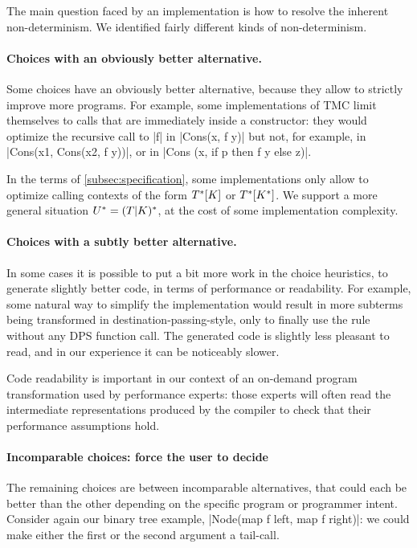 The main question faced by an implementation is how to resolve the
inherent non-determinism. We identified fairly different kinds of
non-determinism.

\paragraph{Choices with an obviously better alternative.} Some choices have an obviously better alternative, because they allow to strictly improve more programs. For example, some implementations of TMC limit themselves to calls that are immediately inside a constructor: they would optimize the recursive call to \ocaml|f| in \ocaml|Cons(x, f y)| but not, for example, in \ocaml|Cons(x1, Cons(x2, f y))|, or in \ocaml|Cons (x, if p then f y else z)|.

In the terms of \cref{subsec:specification}, some implementations only allow to optimize calling contexts of the form $\datalangTailCtx{[\datalangConsFrame]}$ or $\datalangTailCtx{[\datalangConsCtx]}$. We support a more general situation $\datalangTMCCtx = (\datalangTailFrame | \datalangConsFrame)^{*}$, at the cost of some implementation complexity.

\paragraph{Choices with a subtly better alternative.} In some cases it
is possible to put a bit more work in the choice heuristics, to
generate slightly better code, in terms of performance or
readability. For example, some natural way to simplify the
implementation would result in more subterms being transformed in
destination-passing-style, only to finally use the
 rule without any DPS function call. The generated
code is slightly less pleasant to read, and in our experience it can
be noticeably slower.

Code readability is important in our context of an on-demand program
transformation used by performance experts: those experts will often
read the intermediate representations produced by the compiler to
check that their performance assumptions hold.

\paragraph{Incomparable choices: force the user to decide} The
remaining choices are between incomparable alternatives, that could
each be better than the other depending on the specific program or
programmer intent. Consider again our binary tree example,
\ocaml|Node(map f left, map f right)|: we could make either the first
or the second argument a tail-call.

